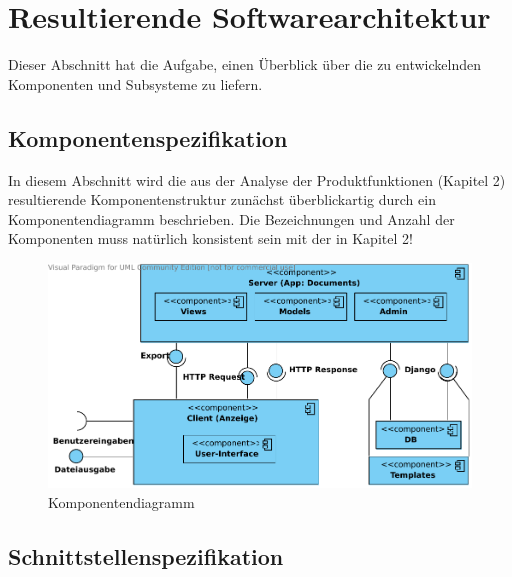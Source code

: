 \chapter{Resultierende Softwarearchitektur}

Dieser Abschnitt hat die Aufgabe, einen Überblick über die zu entwickelnden
Komponenten und Subsysteme zu liefern.
\section{Komponentenspezifikation}

In diesem Abschnitt wird die aus der Analyse der Produktfunktionen (Kapitel 2)
resultierende Komponentenstruktur zunächst überblickartig durch ein
Komponentendiagramm beschrieben. Die Bezeichnungen und Anzahl der Komponenten
muss natürlich konsistent sein mit der in Kapitel 2!

\begin{figure}[h]
    \begin{center}
\includegraphics[width=0.8\linewidth]{bilder/Komponentendiagramm.pdf}
\caption[Komponentendiagramm]{Komponentendiagramm}
\label{Komponentendiagramm}
    \end{center}
\end{figure}

\section{Schnittstellenspezifikation}

